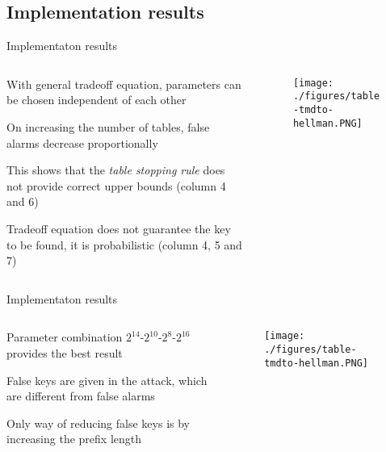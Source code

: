 \documentclass{beamer}
\begin{document}
\subsection*{Implementation results}
\begin{frame}{Implementaton results}
\begin{columns}
\begin{column}{4cm}
\begin{itemize}
\scriptsize{
	\item With general tradeoff equation, parameters can be chosen independent of each other
	\item On increasing the number of tables, false alarms decrease proportionally
	\item This shows that the \emph{table stopping rule} does not provide correct upper bounds (column 4 and 6)
	\item Tradeoff equation does not guarantee the key to be found, it is probabilistic (column 4, 5 and 7)
	
}\end{itemize}
\end{column}
\begin{column}{7cm}
	\begin{figure}[htp]
	\centering
	\texttt{[image: ./figures/table-tmdto-hellman.PNG]}
	\end{figure}
\end{column}	
\end{columns}
\end{frame}

\begin{frame}{Implementaton results}
\begin{columns}
\begin{column}{4cm}
\begin{itemize}
\scriptsize{
	\item Parameter combination $2^{14}$-$2^{10}$-$2^{8}$-$2^{16}$ provides the best result
	\item False keys are given in the attack, which are different from false alarms
	\item Only way of reducing false keys is by increasing the prefix length
}\end{itemize}
\end{column}
\begin{column}{7cm}
	\begin{figure}[htp]
	\centering
	\texttt{[image: ./figures/table-tmdto-hellman.PNG]}
	\end{figure}
\end{column}	
\end{columns}
\end{frame}
\end{document}
